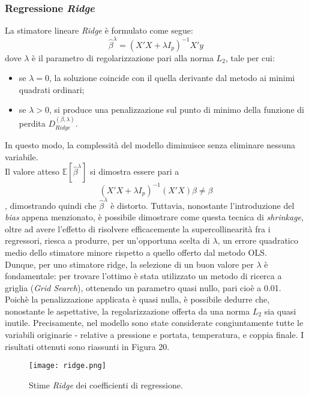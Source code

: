 \documentclass[fleqn,10pt]{SelfArx} %
\begin{document}
\subsubsection{Regressione \textit{Ridge}}
La stimatore lineare \textit{Ridge} è formulato come segue:
\begin{equation}\label{eq}
    \hat{\beta}^{\lambda}=(X'X+\lambda I_p)^{-1}X'y
\end{equation}
dove $\lambda$ è il parametro di regolarizzazione pari alla norma $L_2$, tale per cui:
\begin{itemize}
    \item se $\lambda=0$, la soluzione coincide con il quella derivante dal metodo ai minimi quadrati ordinari;
    \item se $\lambda>0$, si produce una penalizzazione sul punto di minimo della funzione di perdita $D_{Ridge}^{(\beta,\lambda)}$.
\end{itemize}
In questo modo, la complessità del modello diminuisce senza eliminare nessuna variabile.\\
Il valore atteso $\mathbb{E}[\hat{\beta}^{\lambda}]$ si dimostra essere pari a
\begin{equation}
   (X'X+\lambda I_p)^{-1}(X'X)\beta\neq\beta 
\end{equation}
, dimostrando quindi che $\hat{\beta}^{\lambda}$ è distorto. Tuttavia, nonostante l'introduzione del \textit{bias} appena menzionato, è possibile dimostrare come questa tecnica di \textit{shrinkage}, oltre ad avere l'effetto di risolvere efficacemente la supercollinearità fra i regressori, riesca a produrre, per un'opportuna scelta di $\lambda$, un errore quadratico medio dello stimatore minore rispetto a quello offerto dal metodo OLS.\\
Dunque, per uno stimatore ridge, la selezione di un buon valore per $\lambda$ è fondamentale: per trovare l'ottimo è stata utilizzato un metodo di ricerca a griglia (\textit{Grid Search}), ottenendo un parametro quasi nullo, pari cioè a 0.01. Poichè la penalizzazione applicata è quasi nulla, è possibile dedurre che, nonostante le aspettative, la regolarizzazione offerta da una norma $L_2$ sia quasi inutile. Precisamente, nel modello sono state considerate congiuntamente tutte le variabili originarie - relative a pressione e portata, temperatura, e coppia finale. I risultati ottenuti sono riassunti in Figura 20.
\begin{figure}[h]
    \centering
    \texttt{[image: ridge.png]}
    \label{fig:em}
    \caption{Stime \textit{Ridge} dei coefficienti di regressione.}
\end{figure}
\end{document}
